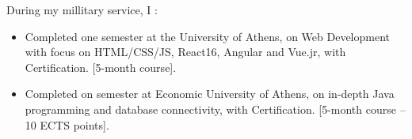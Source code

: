 
During my millitary service, I :
\begin{itemize}
    \item Completed one semester at the University of Athens, on Web Development with focus on HTML/CSS/JS, React16, Angular and Vue.jr, with Certification. [5-month course].
    \item Completed on semester at Economic University of Athens, on in-depth Java programming and database connectivity, with Certification. [5-month course – 10 ECTS points].

\end{itemize}


